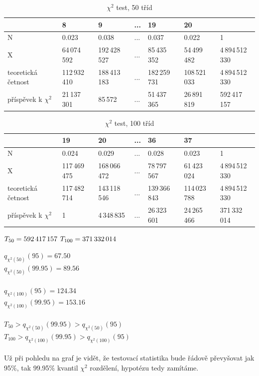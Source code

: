 \documentclass[fleqn,11pt]{article}
\begin{document}
    \begin{table}[htp]
        \footnotesize
        \caption*{$\chi^2$ test, 50 tříd}
        \centering
        \begin{tabular}{|l|l|l|l|l|l||l|}
        \hline
         & 8 & 9 & ... & 19 & 20 & \\ \hline
        N& 0.023 & 0.038 & ... & 0.037 & 0.022 & 1 \\ \hline
        X& 64\,074\,592 & 192\,428\,527 & ... & 85\,435\,352 & 54\,499\,482 & 4\,894\,512\,330 \\ \hline
        teoretická četnost& 112\,932\,410 & 188\,413\,183 & ... & 182\,259\,731 & 108\,521\,033 & 4\,894\,512\,330 \\ \hline
        příspěvek k $\chi^2$& 21\,137\,301 & 85\,572 & ... & 51\,437\,365 & 26\,891\,819 & 592\,417\,157 \\ \hline
        \end{tabular}
    \end{table}

    \begin{table}[htp]
        \footnotesize
        \caption*{$\chi^2$ test, 100 tříd}
        \centering
        \begin{tabular}{|l|l|l|l|l|l||l|}
        \hline
         & 19 & 20 & ... & 36 & 37 & \\ \hline
        N& 0.024 & 0.029 & ... & 0.028 & 0.023 & 1 \\ \hline
        X& 117\,469\,475 & 168\,066\,472 & ... & 78\,797\,567 & 61\,423\,024 & 4\,894\,512\,330 \\ \hline
        teoretická četnost& 117\,482\,714 & 143\,118\,546 & ... & 139\,366\,843 & 114\,023\,788 & 4\,894\,512\,330 \\ \hline
        příspěvek k $\chi^2$& 1 & 4\,348\,835 & ... & 26\,323\,601 & 24\,265\,466 & 371\,332\,014 \\ \hline
        \end{tabular}
    \end{table}


    $T_{50} = 592\,417\,157\\$
    $T_{100} = 371\,332\,014\\$

    $q_{\chi^2(50)}(95) =  67.50$\\
    $q_{\chi^2(50)}(99.95) =  89.56$\\
    \\
    $q_{\chi^2(100)}(95) =  124.34$\\
    $q_{\chi^2(100)}(99.95) =  153.16$\\
    \\
    $T_{50} > q_{\chi^2(50)}(99.95) > q_{\chi^2(50)}(95)$\\
    $T_{100} > q_{\chi^2(100)}(99.95) > q_{\chi^2(100)}(95)$\\
    \\
    Už při pohledu na graf je vidět, že testovací statistika bude řádově převyšovat jak 95\%, tak 99.95\% kvantil $\chi^2$ rozdělení, hypotézu tedy zamítáme.
\end{document}
